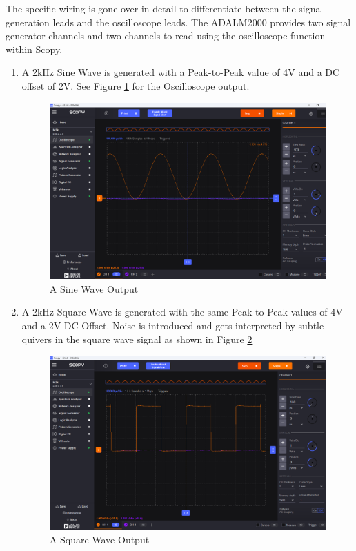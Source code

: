 \documentclass[12pt]{article}
\begin{document}
The specific wiring is gone over in detail to differentiate between the signal
generation leads and the oscilloscope leads. The ADALM2000 provides two signal
generator channels and two channels to read using the oscilloscope function
within Scopy.
\begin{enumerate}
	\item A 2kHz Sine Wave is generated with a Peak-to-Peak value of 4V and a DC
	      offset of 2V. See Figure \ref{fig:sinewave} for the Oscilloscope output.
	      \begin{figure}[H]
		      \centering
		      \includegraphics[width=14cm]{04_01}
		      \caption{A Sine Wave Output}
		      \label{fig:sinewave}
	      \end{figure}

	\item A 2kHz Square Wave is generated with the same Peak-to-Peak values of 4V
	      and a 2V DC Offset. Noise is introduced and gets interpreted by subtle quivers
	      in the square wave signal as shown in Figure \ref{fig:squarewave}

	      \begin{figure}[H]
		      \centering
		      \includegraphics[width=14cm]{04_02}
		      \caption{A Square Wave Output}
		      \label{fig:squarewave}
	      \end{figure}


\end{enumerate}
\end{document}
